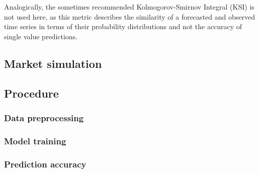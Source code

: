 Analogically, the sometimes recommended Kolmogorov-Smirnov Integral (KSI) \citep{Espinar:2009} is not used here, as this metric describes the similarity of a forecasted and observed time series in terms of their probability distributions and not the accuracy of single value predictions.




\subsection{Market simulation} \label{Sec:Method;Subsec:Market}









\subsection{Procedure} \label{Sec:Method;Subsec:Procedure}


\subsubsection{Data preprocessing}

\subsubsection{Model training}

\subsubsection{Prediction accuracy}

